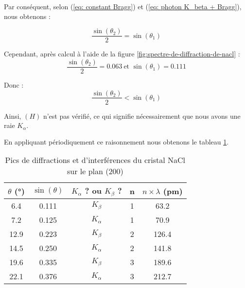 Par conséquent, selon (\ref{eq: constant Bragg}) et (\ref{eq: photon K_beta + Bragg}), nous obtenons :

\begin{equation}
	\frac{\sin(\theta_{2})}{2} = \sin(\theta_{1})
\end{equation}

Cependant, après calcul à l'aide de la figure  \ref{fig:spectre-de-diffraction-de-nacl} :
\begin{equation}
	\frac{\sin(\theta_{2})}{2} = 0.063 \ \text{et } \sin(\theta_{1}) = 0.111
\end{equation}



Donc :
\begin{equation} \label{eq:Inegalite_theta}
	\frac{\sin(\theta_{2})}{2} < \sin(\theta_{1})
\end{equation}

Ainsi, $(H)$ n'est pas vérifié, ce qui signifie nécessairement que nous avons une raie $K_{\alpha}$.

\newpage
En appliquant périodiquement ce raisonnement nous obtenons le tableau \ref{tab:Pic_de_diffraction_et_d'interférence_du_cristal_NaCl_sur_le_plan_200}.


\begin{table}[h!]
	\centering
	\begin{tabular}{|c|c|c|c|c|}
		\hline
		$\theta$ (°) & $\sin(\theta)$ &$K_{\alpha}$ ? ou $K_{\beta}$ ? & n & $n \times \lambda $ (pm) \\ \hline
		6.4       & 0.111      & $K_{\beta}$                     & 1 & 63.2 \\ \hline
		7.2       & 0.125      &$K_{\alpha}$                    & 1 & 70.9 \\ \hline
		12.9      & 0.223      & $K_{\beta}$                     & 2  & 126.4\\ \hline
		14.5      & 0.250      &$K_{\alpha}$                    & 2  & 141.8\\ \hline
		19.6      & 0.335      & $K_{\beta}$                     & 3  & 189.6\\ \hline
		22.1      & 0.376      &$K_{\alpha}$                    & 3  & 212.7 \\ \hline
	\end{tabular}	
	\caption{Pics de diffractions et d'interférences du cristal NaCl sur le plan (200)}
	\label{tab:Pic_de_diffraction_et_d'interférence_du_cristal_NaCl_sur_le_plan_200}
\end{table}





